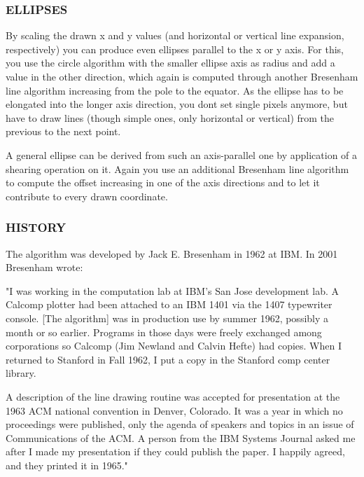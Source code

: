 \subsubsection*{E\+L\+L\+I\+P\+S\+ES}

By scaling the drawn x and y values (and horizontal or vertical line expansion, respectively) you can produce even ellipses parallel to the x or y axis. For this, you use the circle algorithm with the smaller ellipse axis as radius and add a value in the other direction, which again is computed through another Bresenham line algorithm increasing from the pole to the equator. As the ellipse has to be elongated into the longer axis direction, you don\textquotesingle{}t set single pixels anymore, but have to draw lines (though simple ones, only horizontal or vertical) from the previous to the next point.

A general ellipse can be derived from such an axis-\/parallel one by application of a shearing operation on it. Again you use an additional Bresenham line algorithm to compute the offset increasing in one of the axis directions and to let it contribute to every drawn coordinate.

\subsubsection*{H\+I\+S\+T\+O\+RY}

The algorithm was developed by Jack E. Bresenham in 1962 at I\+BM. In 2001 Bresenham wrote\+: \begin{DoxyVerb}"I was working in the computation lab at IBM's San Jose development lab. A Calcomp plotter had been attached to an IBM 1401 via
the 1407 typewriter console. [The algorithm] was in production use by summer 1962, possibly a month or so earlier. Programs in
those days were freely exchanged among corporations so Calcomp (Jim Newland and Calvin Hefte) had copies. When I returned to
Stanford in Fall 1962, I put a copy in the Stanford comp center library.

A description of the line drawing routine was accepted for presentation at the 1963 ACM national convention in Denver,
Colorado. It was a year in which no proceedings were published, only the agenda of speakers and topics in an issue of
Communications of the ACM. A person from the IBM Systems Journal asked me after I made my presentation if they could publish
the paper. I happily agreed, and they printed it in 1965."
\end{DoxyVerb}


